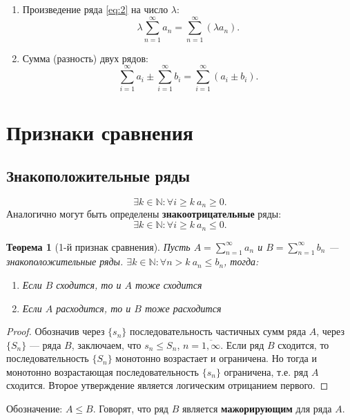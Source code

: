 \documentclass[12pt]{report}
\newtheorem{theorem}{Теорема}
\begin{document}
\begin{enumerate}
\item Произведение ряда \eqref{eq:2} на число $\lambda$:
\[ \lambda \sum_{n = 1}^{\infty} a_n = \sum_{n = 1}^{\infty} (\lambda a_n).\]
\item Сумма (разность) двух рядов:
\[ \sum_{i = 1}^{\infty} a_i \pm \sum_{i = 1}^{\infty} b_i = \sum_{i = 1}^{\infty} (a_i \pm b_i).\]
\end{enumerate}

\section{Признаки сравнения}
\subsection{Знакоположительные ряды}
\[ \exists k \in \mathbb{N} : \forall i \geqslant k~a_n \geqslant 0.\]
Аналогично могут быть определены \textbf{знакоотрицательные} ряды:
\[ \exists k \in \mathbb{N} : \forall i \geqslant k~a_n \leqslant 0.\]

\begin{theorem}[1-й признак сравнения]
Пусть $A = \sum\limits_{n = 1}^{\infty} a_n$ и  $B = \sum\limits_{n = 1}^{\infty}b_n$  --- знакоположительные ряды.
$\exists k \in \mathbb{N} : \forall n > k~ a_n \leqslant b_n$, тогда:
\begin{enumerate}
\item Если $B$ сходится, то и $A$ тоже сходится
\item Если $A$ расходится, то и $B$ тоже расходится
\end{enumerate}
\end{theorem}
\begin{proof}
Обозначив через $\{ s_n \}$ последовательность частичных сумм ряда $A$, через $\{ S_n \}$ --- ряда $B$, заключаем, что $s_n \leqslant S_n$, $n = \overline{1, \infty}$. Если ряд $B$ сходится, то последовательность $\{S_n\}$ монотонно возрастает и ограничена. Но тогда и монотонно возрастающая последовательность $\{s_n\}$ ограничена, т.е. ряд $A$ сходится. Второе утверждение является логическим отрицанием первого.
\end{proof}
Обозначение: $A \leqslant B$. Говорят, что ряд $B$ является \textbf{мажорирующим} для ряда $A$.
\end{document}
